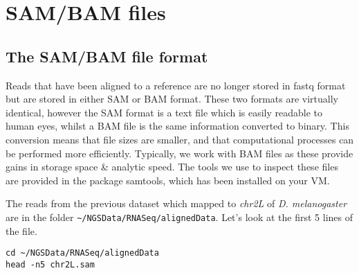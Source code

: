 \chapter{SAM/BAM files}

\section{The SAM/BAM file format}
\begin{information}
Reads that have been aligned to a reference are no longer stored in fastq format but are stored in either SAM or BAM format.
These two formats are virtually identical, however the SAM format is a text file which is easily readable to human eyes, whilst a BAM file is the same information converted to binary.
This conversion means that file sizes are smaller, and that computational processes can be performed more efficiently.
Typically, we work with BAM files as these provide gains in storage space \& analytic speed.
The tools we use to inspect these files are provided in the package samtools, which has been installed on your VM. \\
\end{information}

\begin{steps}
The reads from the previous dataset which mapped to \textit{chr2L} of \textit{D. melanogaster} are in the folder \texttt{\~{}/NGSData/RNASeq/alignedData}.
Let's look at the first 5 lines of the file.
\begin{lstlisting}
cd ~/NGSData/RNASeq/alignedData
head -n5 chr2L.sam  
\end{lstlisting}
\end{steps}

